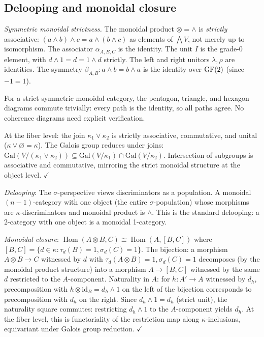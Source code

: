 \subsection{Delooping and monoidal closure}
\label{app:deloop-closure}

\emph{Symmetric monoidal strictness.}
The monoidal product $\otimes = \wedge$ is \emph{strictly}
associative: $(a \wedge b) \wedge c = a \wedge (b \wedge c)$
as elements of $\bigwedge V$, not merely up to isomorphism.
The associator $\alpha_{A,B,C}$ is the identity. The unit
$I$ is the grade-0 element, with $d \wedge 1 = d = 1 \wedge d$
strictly. The left and right unitors $\lambda, \rho$ are
identities. The symmetry $\beta_{A,B}: a \wedge b = b \wedge a$
is the identity over $\operatorname{GF}(2)$ (since $-1 = 1$).

For a strict symmetric monoidal category, the pentagon,
triangle, and hexagon diagrams commute trivially: every
path is the identity, so all paths agree. No coherence
diagrams need explicit verification.

At the fiber level: the join $\kappa_1 \vee \kappa_2$ is
strictly associative, commutative, and unital ($\kappa \vee
\varnothing = \kappa$). The Galois group reduces under
joins: $\mathrm{Gal}(V/(\kappa_1 \vee \kappa_2)) \subseteq
\mathrm{Gal}(V/\kappa_1) \cap \mathrm{Gal}(V/\kappa_2)$.
Intersection of subgroups is associative and commutative,
mirroring the strict monoidal structure at the object level.
$\checkmark$

\emph{Delooping}: The $\sigma$-perspective views
discriminators as a population. A monoidal $(n{-}1)$-category
with one object (the entire $\sigma$-population) whose
morphisms are $\kappa$-discriminators and monoidal product
is $\wedge$. This is the standard delooping: a 2-category
with one object is a monoidal 1-category.

\emph{Monoidal closure}: $\operatorname{Hom}(A \otimes B, C)
\cong \operatorname{Hom}(A, [B, C])$ where
$[B, C] = \{d \in \kappa : \tau_d(B) = 1, \sigma_d(C) = 1\}$.
The bijection: a morphism $A \otimes B \to C$ witnessed by
$d$ with $\tau_d(A \otimes B) = 1, \sigma_d(C) = 1$
decomposes (by the monoidal product structure) into a
morphism $A \to [B, C]$ witnessed by the same $d$ restricted
to the $A$-component. Naturality in $A$: for $h: A' \to A$ witnessed by $d_h$,
precomposition with $h \otimes \mathrm{id}_B = d_h \wedge 1$
on the left of the bijection corresponds to precomposition
with $d_h$ on the right. Since $d_h \wedge 1 = d_h$
(strict unit), the naturality square commutes:
restricting $d_h \wedge 1$ to the $A$-component yields
$d_h$. At the fiber level, this is functoriality of the
restriction map along $\kappa$-inclusions, equivariant
under Galois group reduction. $\checkmark$

